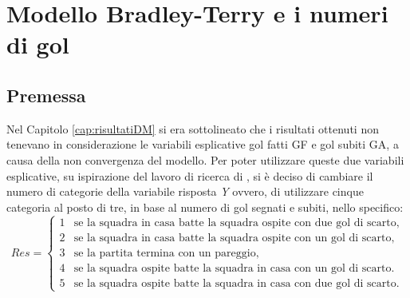 
\chapter{Modello Bradley-Terry e i numeri di gol }
\label{cap:risFin}
\section{Premessa}
Nel Capitolo \ref{cap:risultatiDM} si era sottolineato che i risultati ottenuti non tenevano in considerazione le variabili esplicative gol fatti \textsf{GF} e gol subiti \textsf{GA}, a causa della non convergenza del modello. Per poter utilizzare queste due variabili esplicative, su ispirazione del lavoro di ricerca di \textcite{schauberger2017}, si è deciso di cambiare il numero di categorie della variabile risposta \emph{Y} ovvero, di utilizzare cinque categoria al posto di tre, in base al numero di gol segnati e subiti, nello specifico:
\begin{equation}
	Res =
	\begin{cases}
		1 & \text{se la squadra in casa batte la squadra ospite con due gol di scarto,}\\
		2 & \text{se la squadra in casa batte la squadra ospite con un gol di scarto,}\\
		3 & \text{se la partita termina con un pareggio,}\\
		4 & \text{se la squadra ospite batte la squadra in casa con un gol di scarto. }\\
		5 & \text{se la squadra ospite batte la squadra in casa con due gol di scarto.}
	\end{cases}       
\end{equation}


